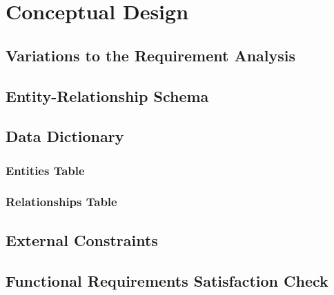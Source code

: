 \section{Conceptual Design}

\subsection{Variations to the Requirement Analysis}

\subsection{Entity-Relationship Schema}

\subsection{Data Dictionary}

\subsubsection{Entities Table}



\subsubsection{Relationships Table}


\subsection{External Constraints}

\subsection{Functional Requirements Satisfaction Check}